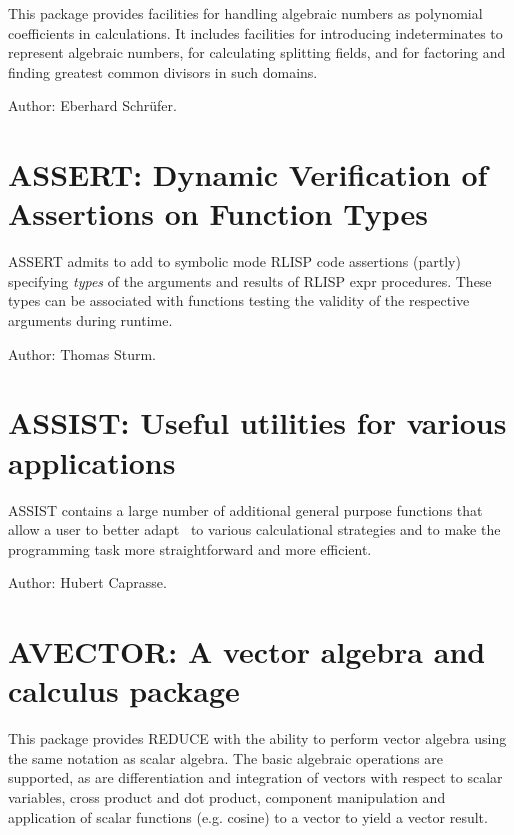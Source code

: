 This package provides facilities for handling algebraic numbers as
polynomial coefficients in {\REDUCE} calculations. It includes facilities for
introducing indeterminates to represent algebraic numbers, for calculating
splitting fields, and for factoring and finding greatest common divisors
in such domains.

Author: Eberhard Schr\"ufer.


\newpage

\section{ASSERT: Dynamic Verification of Assertions on Function Types}
\label{ASSERT}

ASSERT admits to add to symbolic mode RLISP code assertions (partly)          
specifying \emph{types} of the arguments and results of RLISP expr
procedures. These types can be associated with functions testing the
validity of the respective arguments during runtime.

Author: Thomas Sturm.


\newpage

\section{ASSIST: Useful utilities for various applications} 
\label{ASSIST}\hypertarget{ASSIST}{}

ASSIST contains a large number of additional general purpose functions
that allow a user to better adapt \REDUCE\ to various calculational
strategies and to make the programming task more straightforward and more
efficient.

Author: Hubert Caprasse.


\newpage

\section{AVECTOR: A vector algebra and calculus package} 

This package provides REDUCE with the ability to perform vector algebra
using the same notation as scalar algebra.  The basic algebraic operations
are supported, as are differentiation and integration of vectors with
respect to scalar variables, cross product and dot product, component
manipulation and application of scalar functions (e.g. cosine) to a vector
to yield a vector result.

